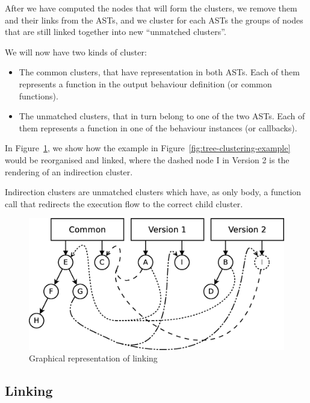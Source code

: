After we have computed the nodes that will form the clusters, we remove
them and their links from the ASTs, and we cluster for each ASTs
the groups of nodes that are still linked together into new ``unmatched 
clusters''.

We will now have two kinds of cluster:
\begin{itemize}
\item The common clusters, that have representation in both ASTs. Each of
them represents a function in the output behaviour definition (or
common functions).
\item The unmatched clusters, that in turn belong to one of the two ASTs.
Each of them represents a function in one of the behaviour instances
(or callbacks).
\end{itemize}

In Figure~\ref{fig:cluster-linking-example}, we show how the example
in Figure~\ref{fig:tree-clustering-example} would be reorganised
and linked, where the dashed node I in Version 2 is the rendering
of an indirection cluster.

Indirection clusters are unmatched clusters which have, as only body,
a function call that redirects the execution flow to the correct child cluster.

\begin{figure}
\centering
\includegraphics[width=1\textwidth]{figures/automatic_beh_inf/diagrams/dia5}
\par

\caption{Graphical representation of linking\label{fig:cluster-linking-example}}

\end{figure}

\subsection{Linking\label{sub:cluster-linking}}

